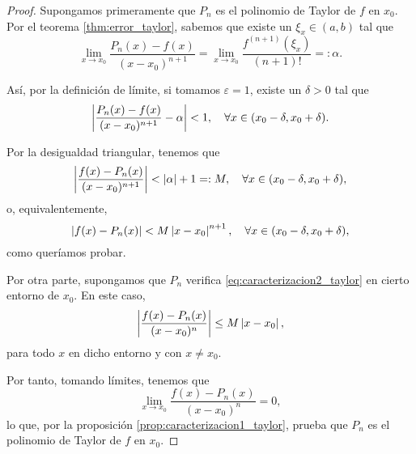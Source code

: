     \begin{proof}
      Supongamos primeramente que $P_n$ es el polinomio de Taylor de $f$ en
      $x_0$. Por el teorema \ref{thm:error_taylor}, sabemos que existe un
      $\xi_x \in (a, b)$ tal que
      \[
        \lim_{x \to x_0} \frac{P_n(x) - f(x)}{(x - x_0)^{n + 1}}
        = \lim_{x \to x_0} \frac{f^{(n+1)}(\xi_x)}{(n+1)!} =: \alpha.
      \]

      Así, por la definición de límite, si tomamos $\varepsilon = 1$,
      existe un $\delta > 0$ tal que
      \[
        \left|\frac{P_n(x) - f(x)}{(x - x_0)^{n + 1}} - \alpha\right| < 1,
        \quad \forall x \in (x_0 - \delta, x_0 + \delta).
      \]

      Por la desigualdad triangular, tenemos que
      \[
        \left|\frac{f(x) - P_n(x)}{(x - x_0)^{n + 1}}\right|
        < \left|\alpha\right| + 1 =: M, 
        \quad \forall x \in (x_0 - \delta, x_0 + \delta),
      \]
      o, equivalentemente,
      \[
        \left|f(x) - P_n(x)\right| < M \left|x - x_0\right|^{n + 1},
        \quad \forall x \in (x_0 - \delta, x_0 + \delta),
      \]
      como queríamos probar.

      Por otra parte, supongamos que $P_n$ verifica
      \ref{eq:caracterizacion2_taylor} en cierto entorno de $x_0$. En este
      caso,
      \[
        \left|\frac{f(x) - P_n(x)}{(x - x_0)^n}\right| \le M \left|x - x_0\right|,
      \]
      para todo $x$ en dicho entorno y con $x \neq x_0$.

      Por tanto, tomando límites, tenemos que
      \[
        \lim_{x \to x_0} \frac{f(x) - P_n(x)}{(x - x_0)^n} = 0,
      \]
      lo que, por la proposición \ref{prop:caracterizacion1_taylor}, prueba
      que $P_n$ es el polinomio de Taylor de $f$ en $x_0$.
    \end{proof}

